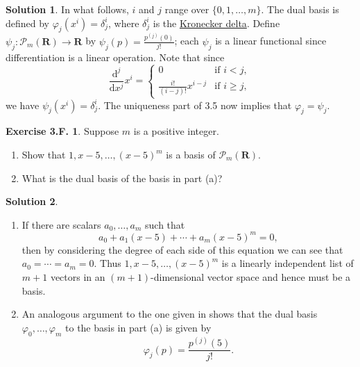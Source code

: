 \documentclass[12pt]{article}
\theoremstyle{definition}
\theoremstyle{exercise}
\newtheorem{exercise}{Exercise 3.F.}
\theoremstyle{solution}
\newtheorem*{solution}{Solution}
\newcommand{\poly}{\mathcal{P}}
\newcommand{\upd}{\text{d}}
\newcommand{\R}{\mathbf{R}}
\begin{document}
\begin{solution}
    In what follows, \( i \) and \( j \) range over \( \{ 0, 1, \ldots, m \} \). The dual basis is defined by \( \varphi_j(x^i) = \delta^i_j \), where \( \delta^i_j \) is the \href{https://en.wikipedia.org/wiki/Kronecker_delta}{Kronecker delta}. Define \( \psi_j : \poly_m(\R) \to \R \) by \( \psi_j(p) = \tfrac{p^{(j)}(0)}{j!} \); each \( \psi_j \) is a linear functional since differentiation is a linear operation. Note that since
    \[
        \frac{\upd^j}{\upd x^j} x^i = \begin{cases}
            0 & \text{if } i < j, \\
            \frac{i!}{(i - j)!} x^{i - j} & \text{if } i \geq j,
        \end{cases}
    \]
    we have \( \psi_j(x^i) = \delta^i_j \). The uniqueness part of 3.5 now implies that \( \varphi_j = \psi_j \).
\end{solution}

\begin{exercise}
\label{ex:8}
    Suppose \( m \) is a positive integer.
    \begin{enumerate}
        \item Show that \( 1, x - 5, \ldots, (x - 5)^m \) is a basis of \( \poly_m(\R) \).

        \item What is the dual basis of the basis in part (a)?
    \end{enumerate}
\end{exercise}

\begin{solution}
    \begin{enumerate}
        \item If there are scalars \( a_0, \ldots, a_m \) such that
        \[
            a_0 + a_1 (x - 5) + \cdots + a_m (x - 5)^m = 0,
        \]
        then by considering the degree of each side of this equation we can see that \( a_0 = \cdots = a_m = 0 \). Thus \( 1, x - 5, \ldots, (x - 5)^m \) is a linearly independent list of \( m + 1 \) vectors in an \( (m + 1) \)-dimensional vector space and hence must be a basis.

        \item An analogous argument to the one given in  shows that the dual basis \( \varphi_0, \ldots, \varphi_m \) to the basis in part (a) is given by
        \[
            \varphi_j(p) = \frac{p^{(j)}(5)}{j!}.
        \]
    \end{enumerate}
\end{solution}
\end{document}
